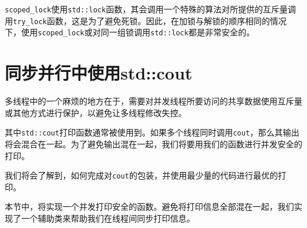 \texttt{scoped\_lock}使用\texttt{std::lock}函数，其会调用一个特殊的算法对所提供的互斥量调用\texttt{try\_lock}函数，这是为了避免死锁。因此，在加锁与解锁的顺序相同的情况下，使用\texttt{scoped\_lock}或对同一组锁调用\texttt{std::lock}都是非常安全的。


\section{同步并行中使用std::cout}

多线程中的一个麻烦的地方在于，需要对并发线程所要访问的共享数据使用互斥量或其他方式进行保护，以避免让多线程修改失控。

其中\texttt{std::cout}打印函数通常被使用到。如果多个线程同时调用\texttt{cout}，那么其输出将会混合在一起。为了避免输出混在一起，我们将要用我们的函数进行并发安全的打印。

我们将会了解到，如何完成对\texttt{cout}的包装，并使用最少量的代码进行最优的打印。


本节中，将实现一个并发打印安全的函数。避免将打印信息全部混在一起，我们实现了一个辅助类来帮助我们在线程间同步打印信息。

